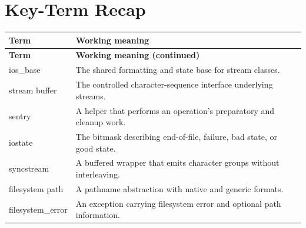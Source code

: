 \documentclass[11pt,letterpaper]{article}
\begin{document}
\section{Key-Term Recap}
\begin{longtable}{@{}>{\RaggedRight\arraybackslash}p{}>{\RaggedRight\arraybackslash}p{}@{}}\toprule\textbf{Term} & \textbf{Working meaning}\\\midrule\endfirsthead\toprule\textbf{Term} & \textbf{Working meaning (continued)}\\\midrule\endhead\bottomrule\endfoot
ios\_\allowbreak{}base & The shared formatting and state base for stream classes.\\
stream buffer & The controlled character-sequence interface underlying streams.\\
sentry & A helper that performs an operation's preparatory and cleanup work.\\
iostate & The bitmask describing end-of-file, failure, bad state, or good state.\\
syncstream & A buffered wrapper that emits character groups without interleaving.\\
filesystem path & A pathname abstraction with native and generic formats.\\
filesystem\_\allowbreak{}error & An exception carrying filesystem error and optional path information.\\
\end{longtable}
\end{document}
